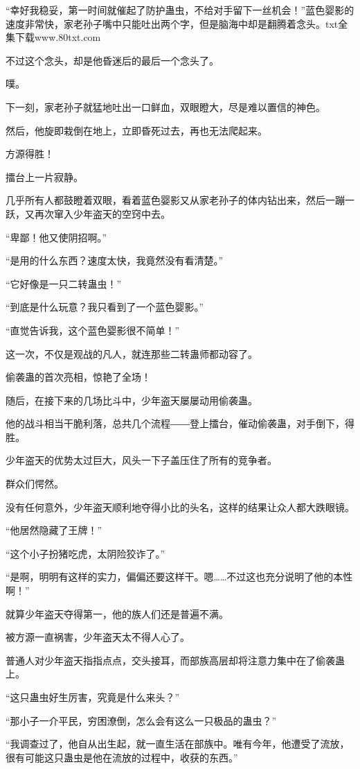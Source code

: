 \begin{this_body}
“幸好我稳妥，第一时间就催起了防护蛊虫，不给对手留下一丝机会！”蓝色婴影的速度非常快，家老孙子嘴中只能吐出两个字，但是脑海中却是翻腾着念头。txt全集下载www.80txt.com

不过这个念头，却是他昏迷后的最后一个念头了。

噗。

下一刻，家老孙子就猛地吐出一口鲜血，双眼瞪大，尽是难以置信的神色。

然后，他旋即栽倒在地上，立即昏死过去，再也无法爬起来。

方源得胜！

擂台上一片寂静。

几乎所有人都鼓瞪着双眼，看着蓝色婴影又从家老孙子的体内钻出来，然后一蹦一跃，又再次窜入少年盗天的空窍中去。

“卑鄙！他又使阴招啊。”

“是用的什么东西？速度太快，我竟然没有看清楚。”

“它好像是一只二转蛊虫！”

“到底是什么玩意？我只看到了一个蓝色婴影。”

“直觉告诉我，这个蓝色婴影很不简单！”

这一次，不仅是观战的凡人，就连那些二转蛊师都动容了。

偷袭蛊的首次亮相，惊艳了全场！

随后，在接下来的几场比斗中，少年盗天屡屡动用偷袭蛊。

他的战斗相当干脆利落，总共几个流程――登上擂台，催动偷袭蛊，对手倒下，得胜。

少年盗天的优势太过巨大，风头一下子盖压住了所有的竞争者。

群众们愕然。

没有任何意外，少年盗天顺利地夺得小比的头名，这样的结果让众人都大跌眼镜。

“他居然隐藏了王牌！”

“这个小子扮猪吃虎，太阴险狡诈了。”

“是啊，明明有这样的实力，偏偏还要这样干。嗯……不过这也充分说明了他的本性啊！”

就算少年盗天夺得第一，他的族人们还是普遍不满。

被方源一直祸害，少年盗天太不得人心了。

普通人对少年盗天指指点点，交头接耳，而部族高层却将注意力集中在了偷袭蛊上。

“这只蛊虫好生厉害，究竟是什么来头？”

“那小子一介平民，穷困潦倒，怎么会有这么一只极品的蛊虫？”

“我调查过了，他自从出生起，就一直生活在部族中。唯有今年，他遭受了流放，很有可能这只蛊虫是他在流放的过程中，收获的东西。”


\end{this_body}
